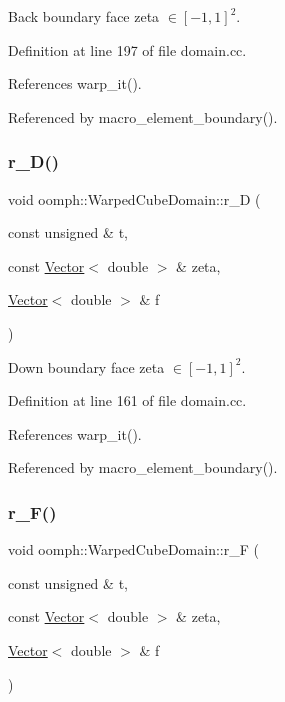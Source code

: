 Back boundary face zeta $ \in [-1,1]^2 $. 



Definition at line 197 of file domain.\+cc.



References warp\+\_\+it().



Referenced by macro\+\_\+element\+\_\+boundary().

\mbox{\label{classoomph_1_1WarpedCubeDomain_a9bb17632961940decb3fd8977fb11e94}} 
\subsubsection{\texorpdfstring{r\+\_\+\+D()}{r\_D()}}
{\footnotesize\ttfamily void oomph\+::\+Warped\+Cube\+Domain\+::r\+\_\+D (\begin{DoxyParamCaption}\item[{const unsigned \&}]{t,  }\item[{const \hyperlink{classoomph_1_1Vector}{Vector}$<$ double $>$ \&}]{zeta,  }\item[{\hyperlink{classoomph_1_1Vector}{Vector}$<$ double $>$ \&}]{f }\end{DoxyParamCaption})\hspace{0.3cm}{\ttfamily [private]}}



Down boundary face zeta $ \in [-1,1]^2 $. 



Definition at line 161 of file domain.\+cc.



References warp\+\_\+it().



Referenced by macro\+\_\+element\+\_\+boundary().

\mbox{\label{classoomph_1_1WarpedCubeDomain_a740c2b20507118f9e4a98490a13271f8}} 
\subsubsection{\texorpdfstring{r\+\_\+\+F()}{r\_F()}}
{\footnotesize\ttfamily void oomph\+::\+Warped\+Cube\+Domain\+::r\+\_\+F (\begin{DoxyParamCaption}\item[{const unsigned \&}]{t,  }\item[{const \hyperlink{classoomph_1_1Vector}{Vector}$<$ double $>$ \&}]{zeta,  }\item[{\hyperlink{classoomph_1_1Vector}{Vector}$<$ double $>$ \&}]{f }\end{DoxyParamCaption})\hspace{0.3cm}{\ttfamily [private]}}



